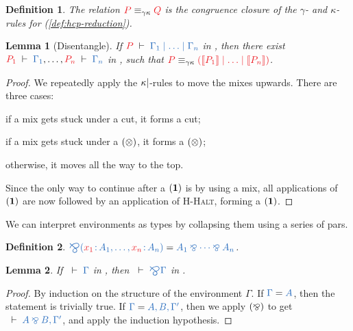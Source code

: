 \documentclass[draft,submission,copyright,creativecommons]{eptcs}
\newtheorem{definition}{Definition}
\newtheorem{lemma}{Lemma}
\begin{document}
\begin{definition}\label{def:hcp-gk}
  The relation $\tm{P}\equiv_{\gamma\kappa}\tm{Q}$ is the congruence closure of
  the $\gamma$- and $\kappa$-rules for \hcp (\cref{def:hcp-reduction}).
\end{definition}

\begin{lemma}[Disentangle]\label{lem:hcp-disentangle}
  If $\seq[P]{\Gamma_1 \hsep \dots \hsep \Gamma_n}$ in \hcp,
  then there exist $\seq[P_1]{\Gamma_1}, \dots, \seq[P_n]{\Gamma_n}$ in \cp,
  such that
  $\tm{P}\equiv_{\gamma\kappa}\tm{(\mtf{P_1}\ppar\dots\ppar\mtf{P_n})}$.
\end{lemma}
\begin{proof}
  We repeatedly apply the $\kappa{\ensuremath{\mid}}$-rules to move the mixes upwards.
  There are three cases:
  \begin{enumerate*}[label={\alph*)}]
  \item
    if a mix gets stuck under a cut, it forms a \cp cut;
  \item
    if a mix gets stuck under a $(\otimes)$, it forms a \cp $(\otimes)$;
  \item
    otherwise, it moves all the way to the top.
  \end{enumerate*}
  Since the only way to continue after a $(\mathbf{1})$ is by using a mix, all
  applications of $(\mathbf{1})$ are now followed by an application of
  \textsc{H-Halt}, forming a \cp $(\mathbf{1})$.
\end{proof}

We can interpret environments as types by collapsing them using a series of
pars.
\begin{definition}\label{def:bigparr}
$\ty{\bigparr(\tmty{x_1}{A_1} , \dots , \tmty{x_n}{A_n})} =  \ty{A_1 \parr \dots \parr A_n}$.
\end{definition}

\begin{lemma}\label{lem:cp-bigparr}
  If $\seq{\Gamma}$ in \cp, then $\seq{\bigparr\Gamma}$ in \cp.
\end{lemma}
\begin{proof}
  By induction on the structure of the environment $\Gamma$.
    If $\ty{\Gamma} = \ty{A}$, then the statement is trivially true.
    If $\ty{\Gamma} = \ty{A, B, \Gamma'}$,
    then we apply $(\mathbin{\bindnasrepma})$ to get $\seq{A \parr B, \Gamma'}$, and apply the induction hypothesis.
\end{proof}
\end{document}
